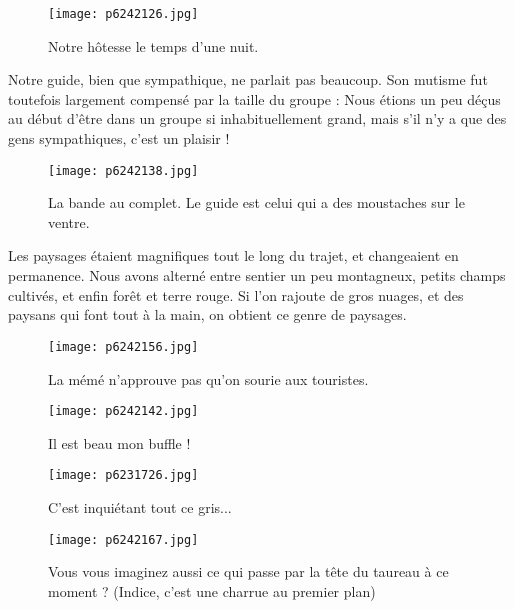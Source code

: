 \documentclass{book}
\begin{document}
\begin{figure}[h]
\centering
\texttt{[image: p6242126.jpg]}
\caption*{Notre hôtesse le temps d'une nuit.}
\end{figure}

Notre guide, bien que sympathique, ne parlait pas beaucoup. Son mutisme fut toutefois largement compensé par la taille du groupe : Nous étions un peu déçus au début d'être dans un groupe si inhabituellement grand, mais s'il n'y a que des gens sympathiques, c'est un plaisir !




\begin{figure}[h]
\centering
\texttt{[image: p6242138.jpg]}
\caption*{La bande au complet. Le guide est celui qui a des moustaches sur le ventre.}
\end{figure}

Les paysages étaient magnifiques tout le long du trajet, et changeaient en permanence. Nous avons alterné entre sentier un peu montagneux, petits champs cultivés, et enfin forêt et terre rouge. Si l'on rajoute de gros nuages, et des paysans qui font tout à la main, on obtient ce genre de paysages.




\begin{figure}[h]
\centering
\texttt{[image: p6242156.jpg]}
\caption*{La mémé n'approuve pas qu'on sourie aux touristes.}
\end{figure}


\begin{figure}[h]
\centering
\texttt{[image: p6242142.jpg]}
\caption*{Il est beau mon buffle !}
\end{figure}


\begin{figure}[h]
\centering
\texttt{[image: p6231726.jpg]}
\caption*{C'est inquiétant tout ce gris...}
\end{figure}


\begin{figure}[h]
\centering
\texttt{[image: p6242167.jpg]}
\caption*{Vous vous imaginez aussi ce qui passe par la tête du taureau à ce moment ? (Indice, c'est une charrue au premier plan)}
\end{figure}
\end{document}
